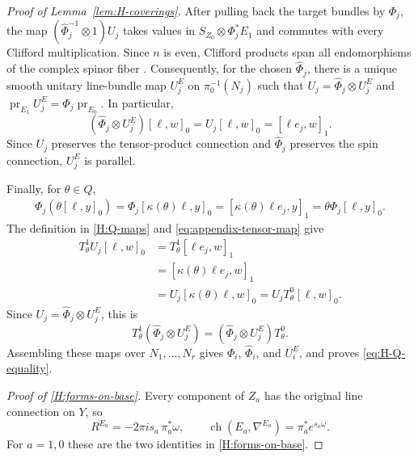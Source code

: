 \documentclass[12pt,reqno]{amsart}
\numberwithin{equation}{section}
\theoremstyle{definition}
\newcommand{\ch}{\operatorname{ch}}
\begin{document}
\begin{proof}[Proof of Lemma~\ref{lem:H-coverings}]
After pulling back the target bundles by $\Phi_j$, the map
$(\widehat\Phi_j^{-1}\otimes1)U_j$ takes values in
$S_{Z_0}\otimes\Phi_j^*E_1$ and commutes with every
Clifford multiplication. Since $n$ is even, Clifford products
span all endomorphisms of the complex spinor fiber
\cite[Chapter~I, Theorem~4.3]{LawsonMichelsohn}. Consequently,
for the chosen $\widehat\Phi_j$, there is a unique smooth
unitary line-bundle map $U_j^E$ on $\pi_0^{-1}(N_j)$ such that
$U_j=\widehat\Phi_j\otimes U_j^E$ and
$\operatorname{pr}_{E_1}U_j^E=\Phi_j\operatorname{pr}_{E_0}$.
In particular,
\begin{equation}\label{eq:appendix-tensor-map}
 (\widehat\Phi_j\otimes U_j^E)[\ell,w]_0
 =U_j[\ell,w]_0=[\ell e_j,w]_1.
\end{equation}
Since $U_j$ preserves the tensor-product connection and
$\widehat\Phi_j$ preserves the spin connection, $U_j^E$ is parallel.

Finally, for $\theta\in Q$,
\[
\begin{aligned}
 \Phi_j(\theta[\ell,y]_0)
 =\Phi_j[\kappa(\theta)\ell,y]_0
 =[\kappa(\theta)\ell e_j,y]_1
  =\theta\Phi_j[\ell,y]_0.
\end{aligned}
\]
The definition in \ref{H:Q-maps} and
\eqref{eq:appendix-tensor-map} give
\[
\begin{aligned}
 T^1_\theta U_j[\ell,w]_0
 &=T^1_\theta[\ell e_j,w]_1\\
 &=[\kappa(\theta)\ell e_j,w]_1\\
 &=U_j[\kappa(\theta)\ell,w]_0
  =U_jT^0_\theta[\ell,w]_0.
\end{aligned}
\]
Since $U_j=\widehat\Phi_j\otimes U_j^E$, this is
\[
 T^1_\theta(\widehat\Phi_j\otimes U_j^E)
 =(\widehat\Phi_j\otimes U_j^E)T^0_\theta.
\]
Assembling these maps over $N_1,\ldots,N_r$ gives
$\Phi_i$, $\widehat\Phi_i$, and $U_i^E$, and proves
\eqref{eq:H-Q-equality}.



\emph{Proof of \ref{H:forms-on-base}.}
Every component of $Z_a$ has the original line connection on $Y$, so
\[
 R^{E_a}=-2\pi i s_a\,\pi_a^*\omega,\qquad
 \ch(E_a,\nabla^{E_a})=\pi_a^*e^{s_a\omega}.
\]
For $a=1,0$ these are the two identities in \ref{H:forms-on-base}.
\end{proof}





\vspace{0.5cm}
\end{document}
